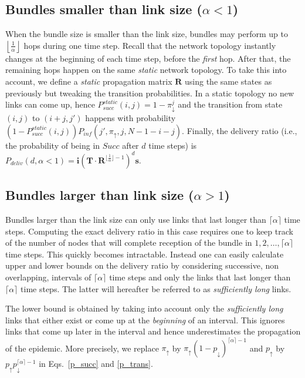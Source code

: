 \documentclass[final,journal,letterpaper]{IEEEtran}
\begin{document}
\subsection{Bundles smaller than link size \texorpdfstring{($\alpha < 1$)}{}}
\label{subsec:p_smaller}

When the bundle size is smaller than the link size, bundles may perform up to $\left \lfloor \frac{1}{\alpha} \right \rfloor$ hops during one time step. Recall that the network topology instantly changes at the beginning of each time step, before the \emph{first} hop. After that, the remaining hops happen on the same \emph{static} network topology. To take this into account, we define a \emph{static} propagation matrix $\mathbf{R}$ using the same states as previously but tweaking the transition probabilities. In a static topology no new links can come up, hence $P_{succ}^{static}(i,j) = 1 - \pi_\downarrow^j$ and the transition from state $(i,j)$ to $(i+j,j')$ happens with probability \mbox{$\left( 1-P_{succ}^{static}(i,j) \right) P_{inf}(j',\pi_\uparrow,j,N-1-i-j)$}. Finally, the delivery ratio (i.e., the probability of being in $Succ$ after $d$ time steps) is \mbox{$P_{deliv}(d,\alpha < 1) = \mathbf{i} \left( \mathbf{T} \cdot \mathbf{R}^{\lfloor \frac{1}{\alpha} \rfloor -1} \right)^d \mathbf{s}$}.

\subsection{Bundles larger than link size \texorpdfstring{($\alpha > 1$)}{}}
\label{subsec:p_greater}

Bundles larger than the link size can only use links that last longer than $\lceil \alpha \rceil$ time steps. Computing the exact delivery ratio in this case requires one to keep track of the number of nodes that will complete reception of the bundle in $1,2, \ldots, \lceil \alpha \rceil$ time steps. This quickly becomes intractable. Instead one can easily calculate upper and lower bounds on the delivery ratio by considering successive, non overlapping, intervals of $\lceil \alpha \rceil$ time steps and only the links that last longer than $\lceil \alpha \rceil$ time steps. The latter will hereafter be referred to as \textit{sufficiently long} links.

The lower bound is obtained by taking into account only the \textit{sufficiently long} links that either exist or come up at the \emph{beginning} of an interval. This ignores links that come up later in the interval and hence underestimates the propagation of the epidemic. More precisely, we replace $\pi_\uparrow$ by $\pi_\uparrow (1-p_\downarrow)^{\lceil \alpha \rceil - 1}$ and $p_\uparrow$ by $p_\uparrow p_\downarrow^{\lceil \alpha \rceil - 1}$ in Eqs.~\ref{p_succ} and \ref{p_trans}.
\end{document}
